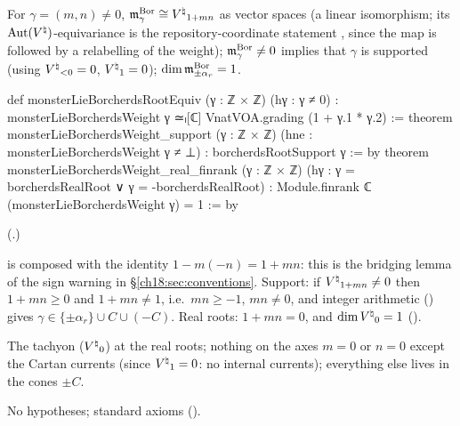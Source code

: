 \begin{theorem}\label{ch18:thm:borcherdsroot}
For $\gamma=(m,n)\neq0$, $\mathfrak{m}^{\mathrm{Bor}}_\gamma\cong{V^{\natural}}_{1+mn}$ as vector spaces (a linear isomorphism; its $\operatorname{Aut}({V^{\natural}})$-equivariance is
the repository-coordinate statement , since the map is 
followed by a relabelling of the weight); $\mathfrak{m}^{\mathrm{Bor}}_\gamma\neq0$ implies that $\gamma$ is supported (using ${V^{\natural}}_{<0}=0$,
${V^{\natural}}_1=0$); $\dim\mathfrak{m}^{\mathrm{Bor}}_{\pm\alpha_r}=1$.
\end{theorem}
\begin{leancode}
def monsterLieBorcherdsRootEquiv (γ : ℤ × ℤ) (hγ : γ ≠ 0) :
    monsterLieBorcherdsWeight γ ≃ₗ[ℂ] VnatVOA.grading (1 + γ.1 * γ.2) :=
theorem monsterLieBorcherdsWeight_support (γ : ℤ × ℤ) (hne : monsterLieBorcherdsWeight γ ≠ ⊥) :
    borcherdsRootSupport γ := by
theorem monsterLieBorcherdsWeight_real_finrank (γ : ℤ × ℤ)
    (hγ : γ = borcherdsRealRoot ∨ γ = -borcherdsRealRoot) :
    Module.finrank ℂ (monsterLieBorcherdsWeight γ) = 1 := by
\end{leancode}
(.)
\begin{dictionary}
 is  composed with the identity
$1-m(-n)=1+mn$: this is the bridging lemma of the sign warning in \S\ref{ch18:sec:conventions}.  Support: if
${V^{\natural}}_{1+mn}\neq0$ then $1+mn\ge0$ and $1+mn\ne1$, i.e.\ $mn\ge-1$, $mn\ne0$, and integer arithmetic
() gives $\gamma\in\{\pm\alpha_r\}\cup C\cup(-C)$.  Real roots: $1+mn=0$, and $\dim{V^{\natural}}_0=1$
().
\end{dictionary}
\begin{physics}
The tachyon (${V^{\natural}}_0$) at the real roots; nothing on the axes $m=0$ or $n=0$ except the Cartan currents (since
${V^{\natural}}_1=0$: no internal currents); everything else lives in the cones $\pm C$.
\end{physics}
\begin{status}No hypotheses; standard axioms ().\end{status}

